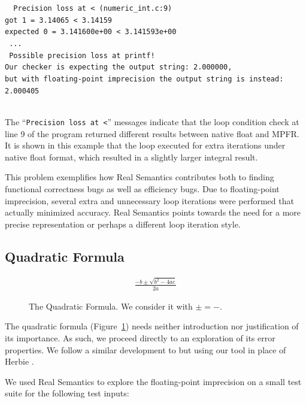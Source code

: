 {\tt\footnotesize
\textcolor{red!70!black} {
Precision loss at < (numeric\_int.c:9)\\
  got 1 = 3.14065 < 3.14159\\
  expected 0 = 3.141600e+00 < 3.141593e+00\\
}
  ...\\
\textcolor{red!70!black} {
  Possible precision loss at printf!\\
  Our checker is expecting the output string: 2.000000,\\
  but with floating-point imprecision the output string is instead: 2.000405\\
}
}

The ``{\tt Precision loss at <}'' messages indicate that the loop condition check at line 9 of the program returned different results between native float and MPFR. It is shown in this example that the loop executed for extra iterations under native float format, which resulted in a slightly larger integral result.

This problem exemplifies how Real Semantics contributes both to finding functional correctness bugs as well as efficiency bugs. Due to floating-point imprecision, several extra and unnecessary loop iterations were performed that actually minimized accuracy. Real Semantics points towards the need for a more precise representation or perhaps a different loop iteration style.

\subsection{Quadratic Formula}

\begin{figure}
\centering
\begin{align*}
\frac{-b \pm \sqrt{b^2 - 4ac}}{2a}
\end{align*}
\caption{The Quadratic Formula. We consider it with $\pm = -$.}
\label{fig:quadratic_formula}
\end{figure}

The quadratic formula (Figure~\ref{fig:quadratic_formula}) needs neither introduction nor justification of its importance. As such, we proceed directly to an exploration of its error properties. We follow a similar development to \citeauthor{herbie} but using our tool in place of Herbie \cite{herbie}.

We used Real Semantics to explore the floating-point imprecision on a small test suite for the following test inputs:

